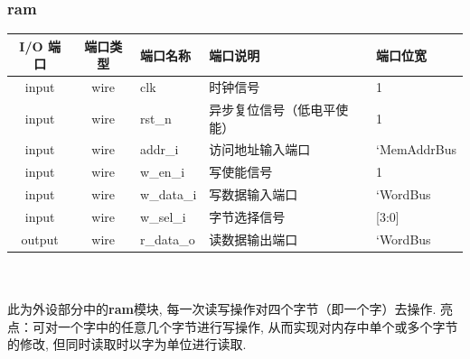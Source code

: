 \documentclass[lang=cn,11pt,a4paper,chinesefont=founder]{elegantpaper}
\begin{document}
\subsubsection{ram}
\begin{tabular}{cclll}
    \toprule
    I/O 端口 & 端口类型 & 端口名称   & 端口说明                   & 端口位宽    \\
    \midrule
    input    & wire     & clk        & 时钟信号                   & 1           \\
    input    & wire     & rst\_n     & 异步复位信号（低电平使能） & 1           \\

    input    & wire     & addr\_i    & 访问地址输入端口           & `MemAddrBus \\
    input    & wire     & w\_en\_i   & 写使能信号                 & 1           \\
    input    & wire     & w\_data\_i & 写数据输入端口             & `WordBus    \\
    input    & wire     & w\_sel\_i  & 字节选择信号               & [3:0]       \\

    output   & wire     & r\_data\_o & 读数据输出端口             & `WordBus    \\
    \bottomrule
\end{tabular}\\
\\
此为外设部分中的\textbf{ram}模块, 每一次读写操作对四个字节（即一个字）去操作. 
亮点：可对一个字中的任意几个字节进行写操作, 从而实现对内存中单个或多个字节的修改, 但同时读取时以字为单位进行读取. 
\end{document}
